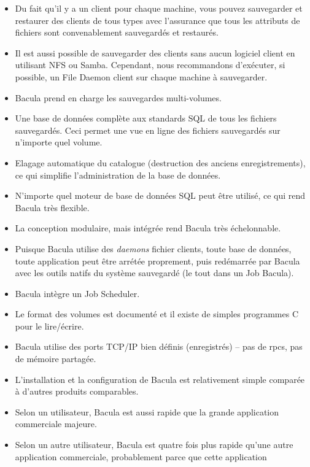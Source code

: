 \begin{itemize}
\item Du fait qu'il y a un client pour chaque machine, vous pouvez 
   sauvegarder et restaurer des clients de tous types avec  l'assurance que tous
   les attributs de fichiers sont convenablement  sauvegard\'es et restaur\'es.  
\item Il est aussi possible de sauvegarder des clients sans aucun  logiciel
   client en utilisant NFS ou Samba. Cependant, nous recommandons  d'ex\'ecuter,
   si possible, un File Daemon client sur chaque machine  \`a sauvegarder.  
\item Bacula prend en charge les sauvegardes multi-volumes.  
\item Une base de donn\'ees compl\`ete aux standards SQL de tous les fichiers 
   sauvegard\'es. Ceci permet une vue en ligne des fichiers  sauvegard\'es sur
   n'importe quel volume.  
\item Elagage automatique du catalogue (destruction des anciens
   enregistrements),  ce qui simplifie l'administration de la base de donn\'ees. 
\item N'importe quel moteur de base de donn\'ees SQL peut \^etre utilis\'e, ce
   qui  rend Bacula tr\`es flexible.  
\item La conception modulaire, mais int\'egr\'ee rend Bacula tr\`es
   \'echelonnable.  
\item Puisque Bacula utilise des {\it daemons} fichier clients, toute base de
   donn\'ees,  toute application peut \^etre arr\'et\'ee proprement, puis
   red\'emarr\'ee par Bacula  avec les outils natifs du syst\`eme sauvegard\'e
  (le tout dans un Job Bacula).  
\item Bacula int\`egre un Job Scheduler.  
\item Le format des volumes est document\'e et il existe de simples programmes C
 pour le lire/\'ecrire.  
\item Bacula utilise des ports TCP/IP bien d\'efinis (enregistr\'es) -- pas de
   rpcs, pas  de m\'emoire partag\'ee.  
\item L'installation et la configuration de Bacula est relativement simple 
   compar\'ee \`a d'autres produits comparables.  
\item Selon un utilisateur, Bacula est aussi rapide que la grande application 
   commerciale majeure.  
\item Selon un autre utilisateur, Bacula est quatre fois plus rapide qu'une
   autre  application commerciale, probablement parce que cette application

\end{itemize}
